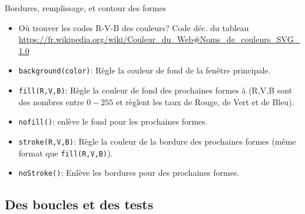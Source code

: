 \documentclass[a4paper, 8pt]{article}
\theoremstyle{definition}
\begin{document}


\thispagestyle{fancy}
\begin{bclogo}[logo = \bccrayon, arrondi = 0.1, noborder = true]{\textcolor{redStruc}{Bordures, remplissage, et contour des formes}}
\begin{itemize}[font= \color{redStruc} \small , label = \textbullet ]
\item Où trouver les codes R-V-B des couleurs? Code déc. du tableau \url{https://fr.wikipedia.org/wiki/Couleur_du_Web#Noms_de_couleurs_SVG_1.0}
\item \texttt{background(color)}: Règle la couleur de fond de la fenêtre principale.
\item \texttt{fill(R,V,B)}: Règle la couleur de fond des prochaines formes à (R,V,B sont des nombres entre $0-255$ et règlent les taux de Rouge, de Vert et de Bleu).
\item \texttt{nofill()}: enlève le fond pour les prochaines formes.
\item \texttt{stroke(R,V,B)}: Règle la couleur de la bordure des prochaines formes (même format que \texttt{fill(R,V,B)}).
\item \texttt{noStroke()}:  Enlève les bordures pour des prochaines formes.
\end{itemize} \end{bclogo}

\subsection*{Des boucles et des tests}

\end{document}
